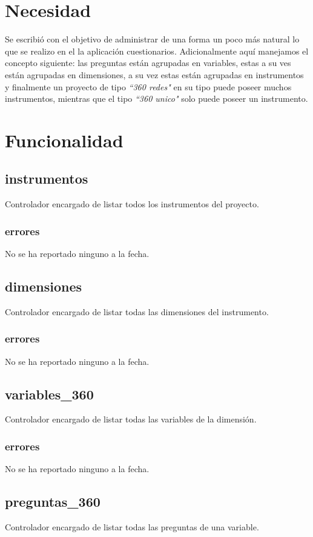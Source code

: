 \documentclass[10pt,a4paper]{book}
\begin{document}
	\section{Necesidad}
	
	Se escribió con el objetivo de administrar de una forma un poco más natural lo que se realizo en el la aplicación cuestionarios. Adicionalmente aquí manejamos el concepto siguiente: las preguntas están agrupadas en variables, estas a su ves están agrupadas en dimensiones, a su vez estas están agrupadas en instrumentos y finalmente un proyecto de tipo \textit{``360 redes"} en su tipo puede poseer muchos instrumentos, mientras que el tipo \textit{``360 unico"} solo puede poseer un instrumento.
	
	\section{Funcionalidad}

	\subsection{instrumentos}
	Controlador encargado de listar todos los instrumentos del proyecto.
	\subsubsection{errores}
	No se ha reportado ninguno a la fecha.
	
	\subsection{dimensiones}
	Controlador encargado de listar todas las dimensiones del instrumento.
	\subsubsection{errores}
	No se ha reportado ninguno a la fecha.
	
	\subsection{variables\_360}
	Controlador encargado de listar todas las variables de la dimensión.
	\subsubsection{errores}
	No se ha reportado ninguno a la fecha.
	
	\subsection{preguntas\_360}
	Controlador encargado de listar todas las preguntas de una variable.
\end{document}
